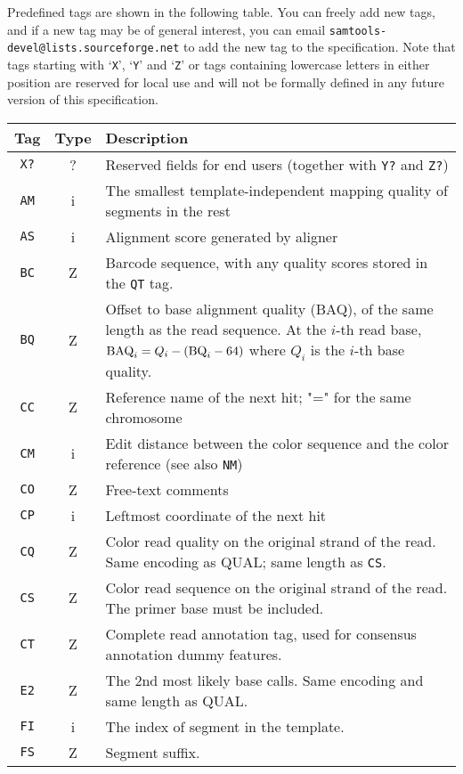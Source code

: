 \documentclass[10pt]{article}
\begin{document}
{Predefined tags are shown in the following table. You can
  freely add new tags, and if a new tag may be of general interest, you
  can email {\tt samtools-devel@lists.sourceforge.net} to add the new tag
  to the specification. Note that tags starting with `{\tt X}', `{\tt Y}'
  and `{\tt Z}' or tags containing lowercase letters in either position
  are reserved for local use and will not be formally
  defined in any future version of this specification.}
\begin{center}\small
\begin{tabular}{ccp{12.5cm}}
  \hline
  {\bf Tag\footnotemark[1]} & {\bf Type} & {\bf Description} \\
  \hline
  {\tt X?} & ? & Reserved fields for end users (together with {\tt Y?} and {\tt Z?}) \\
  {\tt AM} & i & The smallest template-independent mapping quality of segments in the rest \\
  {\tt AS} & i & Alignment score generated by aligner \\
  {\tt BC} & Z & Barcode sequence, with any quality scores stored in the {\tt QT} tag. \\
  {\tt BQ} & Z & Offset to base alignment quality (BAQ), of the same length as the read sequence.
  At the $i$-th read base, ${\rm BAQ}_i=Q_i-({\rm BQ}_i-64)$ where $Q_i$ is the $i$-th base quality. \\
  {\tt CC} & Z & Reference name of the next hit; "=" for the same chromosome \\
  {\tt CM} & i & Edit distance between the color sequence and the color reference (see also {\tt NM})\\
  {\tt CO} & Z & Free-text comments \\
  {\tt CP} & i & Leftmost coordinate of the next hit \\ 
  {\tt CQ} & Z & Color read quality on the original strand of the read. Same encoding as {\sf QUAL}; same length as {\tt CS}.\\
  {\tt CS} & Z & Color read sequence on the original strand of the read. The primer base must be included.\\
  {\tt CT} & Z & Complete read annotation tag, used for consensus annotation dummy features\footnotemark[3].\\
  {\tt E2} & Z & The 2nd most likely base calls. Same encoding and same length as {\sf QUAL}.\\
  {\tt FI} & i & The index of segment in the template.\\
  {\tt FS} & Z & Segment suffix.\\

\end{tabular}
\end{center}
\end{document}

